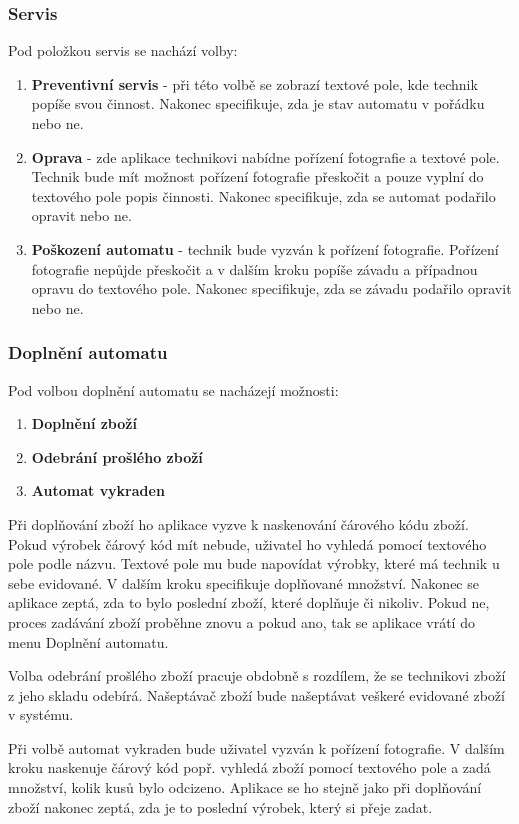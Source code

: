 \documentclass[a4paper,10pt]{article}
\begin{document}
\subsubsection{Servis}
Pod položkou servis se nachází volby:
\begin{enumerate}
	\item \textbf{Preventivní servis} - při této volbě se zobrazí textové pole, kde technik popíše svou činnost. Nakonec specifikuje, zda je stav automatu v pořádku nebo ne.
	\item \textbf{Oprava} - zde aplikace technikovi nabídne pořízení fotografie a textové pole. Technik bude mít možnost pořízení fotografie přeskočit a pouze vyplní do textového pole popis činnosti. Nakonec specifikuje, zda se automat podařilo opravit nebo ne.
	\item \textbf{Poškození automatu} - technik bude vyzván k pořízení fotografie. Pořízení fotografie nepůjde přeskočit a v dalším kroku popíše závadu a případnou opravu do textového pole. Nakonec specifikuje, zda se závadu podařilo opravit nebo ne.
\end{enumerate}

\subsubsection{Doplnění automatu}
Pod volbou doplnění automatu se nacházejí možnosti:
\begin{enumerate}
	\item \textbf{Doplnění zboží}
	\item \textbf{Odebrání prošlého zboží}
	\item \textbf{Automat vykraden}
\end{enumerate}

Při doplňování zboží ho aplikace vyzve k naskenování čárového kódu zboží. Pokud výrobek čárový kód mít nebude, uživatel ho vyhledá pomocí textového pole podle názvu. Textové pole mu bude napovídat výrobky, které má technik u sebe evidované. V dalším kroku specifikuje doplňované množství. Nakonec se aplikace zeptá, zda to bylo poslední zboží, které doplňuje či nikoliv. Pokud ne, proces zadávání zboží proběhne znovu a pokud ano, tak se aplikace vrátí do menu Doplnění automatu.

Volba odebrání prošlého zboží pracuje obdobně s rozdílem, že se technikovi zboží z jeho skladu odebírá. Našeptávač zboží bude našeptávat veškeré evidované zboží v systému.

Při volbě automat vykraden bude uživatel vyzván k pořízení fotografie. V dalším kroku naskenuje čárový kód popř. vyhledá zboží pomocí textového pole a zadá množství, kolik kusů bylo odcizeno. Aplikace se ho stejně jako při doplňování zboží nakonec zeptá, zda je to poslední výrobek, který si přeje zadat.
\end{document}
